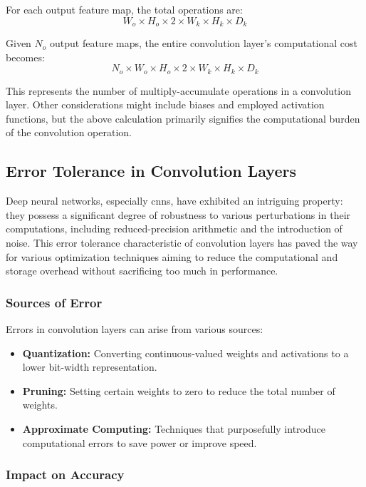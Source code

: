 For each output feature map, the total operations are:
\begin{equation}
W_o \times H_o \times 2 \times W_k \times H_k \times D_k
\end{equation}

Given \( N_o \) output feature maps, the entire convolution layer's computational cost becomes:
\begin{equation}
N_o \times W_o \times H_o \times 2 \times W_k \times H_k \times D_k
\end{equation}

This represents the number of multiply-accumulate operations in a convolution layer. Other considerations might include biases and employed activation functions, but the above calculation primarily signifies the computational burden of the convolution operation.

\subsection{Error Tolerance in Convolution Layers}

Deep neural networks, especially \glspl{cnn}, have exhibited an intriguing property: they possess a significant degree of robustness to various perturbations in their computations, including reduced-precision arithmetic and the introduction of noise. This error tolerance characteristic of convolution layers has paved the way for various optimization techniques aiming to reduce the computational and storage overhead without sacrificing too much in performance.

\subsubsection{Sources of Error}

Errors in convolution layers can arise from various sources:
\begin{itemize}
	\item \textbf{Quantization:} Converting continuous-valued weights and activations to a lower bit-width representation.
	\item \textbf{Pruning:} Setting certain weights to zero to reduce the total number of weights.
	\item \textbf{Approximate Computing:} Techniques that purposefully introduce computational errors to save power or improve speed.
\end{itemize}

\subsubsection{Impact on Accuracy}

